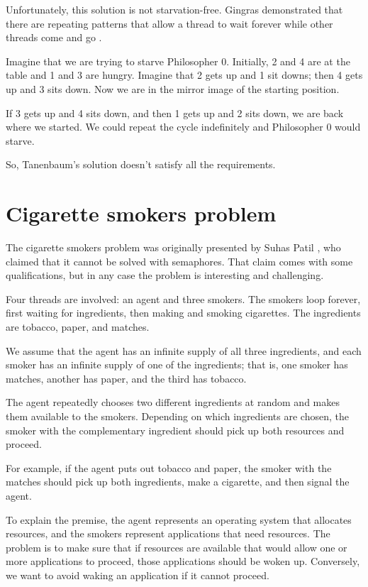 \documentclass{book}
\newcommand{\clearemptydoublepage}{\newpage\cleardoublepage}
\begin{document}
Unfortunately, this solution is not starvation-free.  Gingras
demonstrated that there are repeating patterns that allow a
thread to wait forever while other threads come and go
\cite{gingras90dining}.

Imagine that we are trying to starve Philosopher 0.  Initially,
2 and 4 are at the table and 1 and 3 are hungry.  Imagine that 2 gets up and
1 sit downs; then 4 gets up and 3 sits down.
Now we are in the mirror image of the starting position.

If 3 gets up and 4 sits
down, and then 1 gets up and 2 sits down, we are back
where we started.  We could repeat the cycle indefinitely and
Philosopher 0 would starve.

So, Tanenbaum's solution doesn't satisfy all the requirements.




\clearemptydoublepage
\section {Cigarette smokers problem}

The cigarette smokers problem was originally presented by
Suhas Patil \cite{patil}, who claimed that it cannot be solved with
semaphores.  That claim comes with some qualifications, but in
any case the problem is interesting and challenging.

Four threads are involved: an agent and three smokers.  The smokers
loop forever, first waiting for ingredients, then making and smoking
cigarettes.  The ingredients are tobacco, paper, and matches.

We assume that the agent has an infinite supply of all three
ingredients, and each smoker has an infinite supply of one of
the ingredients; that is, one smoker has matches, another has
paper, and the third has tobacco.

The agent repeatedly chooses two different ingredients at random
and makes them available to the smokers.  Depending on which
ingredients are chosen, the smoker with the complementary ingredient
should pick up both resources and proceed.

For example, if the agent puts out tobacco and paper, the
smoker with the matches should pick up both ingredients, make
a cigarette, and then signal the agent.

To explain the premise, the agent represents an operating system that
allocates resources, and the smokers represent applications that need
resources.  The problem is to make sure that if resources are
available that would allow one or more applications to proceed,
those applications should be woken up.  Conversely, we want to avoid
waking an application if it cannot proceed.
\end{document}
